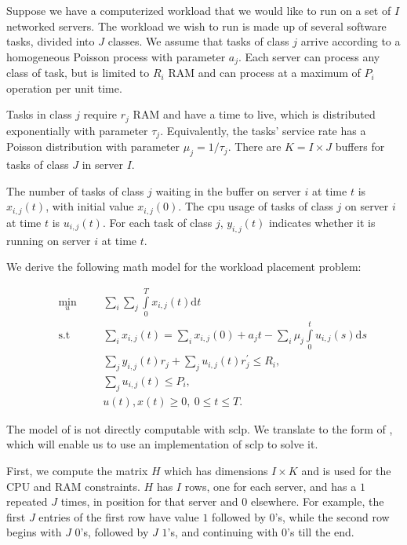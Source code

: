 \documentclass[11pt,a4paper,titlepage]{article}
\theoremstyle{definition}
\begin{document}
Suppose we have a computerized workload that we would like to run on a set of $I$ networked servers.
The workload we wish to run is made up of several software tasks,
divided into $J$ classes.
We assume that tasks of class $j$ arrive according to
a homogeneous Poisson process with parameter $a_j$.
Each server can process any class of task,
but is limited to $R_i$ RAM and can process at a maximum of $P_i$ operation per unit time.

Tasks in class $j$ require $r_j$ RAM and have a time to live,
which is distributed exponentially with parameter $\tau_j$.
Equivalently, the tasks' service rate has a Poisson distribution with parameter $\mu_j = 1/\tau_j$.
There are $K = I \times J$ buffers for tasks of class $J$ in server $I$.

The number of tasks of class $j$ waiting in the buffer on server $i$ at time $t$ is $x_{i,j}(t)$,
with initial value $x_{i,j}(0)$.
The cpu usage of tasks of class $j$ on server $i$ at time $t$ is $u_{i,j}(t)$.
For each task of class $j$, $y_{i,j}(t)$ indicates whether it is running on server $i$ at time $t$.

We derive the following math model for the workload placement problem:

\begin{align}%
    && \min\limits_{u} &&& \sum\limits_i \sum\limits_j
    \int\limits_0^T x_{i,j}(t) \mathrm{d}t \nonumber \\
    && \mbox{s.t} &&&
    \sum\limits_i x_{i,j}(t) = \sum\limits_i x_{i,j}(0) + a_j t -
    \sum\limits_i {\mu_j}  \int\limits_0^t u_{i,j}(s) \textrm{d}s
    \label{eq:workload-placement} \\
    &&&&& \sum\limits_j y_{i,j}(t) r_j + \sum\limits_j u_{i,j}(t) r^\prime_j \leq R_i, \nonumber \\
    &&&&& \sum\limits_j u_{i,j}(t) \leq P_i, \nonumber \\
    &&&&& u(t), x(t) \geq 0, ~ 0 \leq t \leq T. \nonumber
\end{align}%

The model of  is not directly computable with \gls{sclp}.
We translate  to the form of ,
which will enable us to use an implementation of \gls{sclp} to solve it.

First,
we compute the matrix $H$ which has dimensions $I \times K$
and is used for the CPU and RAM constraints.
$H$ has $I$ rows,
one for each server,
and has a $1$ repeated $J$ times,
in position for that server and $0$ elsewhere.
For example,
the first $J$ entries of the first row have value $1$ followed by $0$'s,
while the second row begins with $J$ $0$'s,
followed by $J$ $1$'s,
and continuing with $0$'s till the end.
\end{document}
